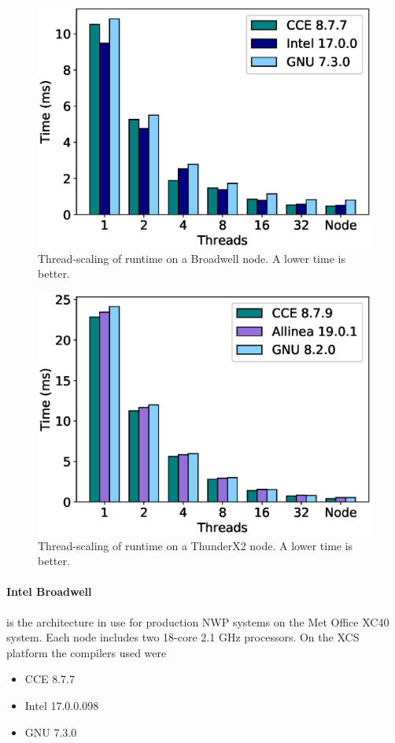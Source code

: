 \begin{figure}
\centering\includegraphics[scale=0.5]{figs/Broadwell_microbenchmark_vanilla.eps}
\caption{Thread-scaling of runtime on a Broadwell node. A lower time is better.}
\end{figure}

\begin{figure}
\centering\includegraphics[scale=0.5]{figs/ThunderX2_microbenchmark_vanilla.eps}
\caption{Thread-scaling of runtime on a ThunderX2 node. A lower time is better.}
\end{figure}

\paragraph{Intel Broadwell} is the architecture in use for production NWP systems on the Met Office XC40 system.
Each node includes two 18-core 2.1 GHz processors.
On the XCS platform the compilers used were
\begin{itemize}
\item CCE 8.7.7
\item Intel 17.0.0.098
\item GNU 7.3.0
\end{itemize}

